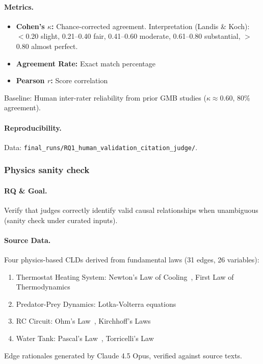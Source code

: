 \paragraph{Metrics.}
\begin{itemize}[noitemsep]
    \item \textbf{Cohen's $\kappa$:} Chance-corrected agreement. Interpretation (Landis \& Koch): $<$0.20 slight, 0.21--0.40 fair, 0.41--0.60 moderate, 0.61--0.80 substantial, $>$0.80 almost perfect.
    \item \textbf{Agreement Rate:} Exact match percentage
    \item \textbf{Pearson $r$:} Score correlation
\end{itemize}
Baseline: Human inter-rater reliability from prior GMB studies ($\kappa \approx 0.60$, 80\% agreement).

\paragraph{Reproducibility.}
Data: \texttt{final\_runs/RQ1\_human\_validation\_citation\_judge/}.

\subsubsection{Physics sanity check}
\label{sec:physics_validation}

\paragraph{RQ \& Goal.}
Verify that judges correctly identify valid causal relationships when unambiguous (sanity check under curated inputs).

\paragraph{Source Data.}
Four physics-based CLDs derived from fundamental laws (31 edges, 26 variables):
\begin{enumerate}[noitemsep]
    \item Thermostat Heating System: Newton's Law of Cooling~\cite{newton1701scala}, First Law of Thermodynamics~\cite{clausius1850heat}
    \item Predator-Prey Dynamics: Lotka-Volterra equations~\cite{lotka1925elements,volterra1928fluctuations}
    \item RC Circuit: Ohm's Law~\cite{ohm1827galvanische}, Kirchhoff's Laws~\cite{kirchhoff1845durchgang}
    \item Water Tank: Pascal's Law~\cite{pascal1663equilibre}, Torricelli's Law~\cite{torricelli1644opera}
\end{enumerate}
Edge rationales generated by Claude 4.5 Opus, verified against source texts.

